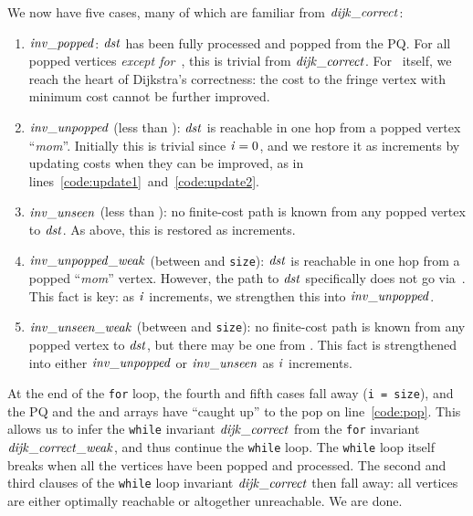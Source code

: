 We now have five cases, many of which are familiar from $\mathit{dijk\_correct}$:
\begin{enumerate}
\item $\mathit{inv\_popped}$: $\mathit{dst}$ has been fully processed and
popped from the PQ.  For all popped vertices \emph{except for}~,
this is trivial from $\mathit{dijk\_correct}$. For~ itself, we reach the heart of Dijkstra's correctness: the cost to the fringe vertex with minimum cost cannot be further improved.  %
\item $\mathit{inv\_unpopped}$ (less than ): $\mathit{dst}$ is reachable in
one hop from a popped vertex ``\emph{mom}''. Initially this is trivial since $\mathit{i}=0$, and we restore it as  increments by updating costs when they can be improved, as in lines~\ref{code:update1}~and~\ref{code:update2}.
\item $\mathit{inv\_unseen}$ (less than ): no finite-cost path is known from any popped vertex to $\mathit{dst}$. As above, this is restored as  increments.
\item $\mathit{inv\_unpopped\_weak}$ (between  and \texttt{size}):
$\mathit{dst}$ is reachable in one hop from a popped ``\emph{mom}'' vertex.
However, the path to $\mathit{dst}$ specifically does not go via~.
This fact is key: as $\mathit{i}$ increments, we strengthen this 
into $\mathit{inv\_unpopped}$.
\item $\mathit{inv\_unseen\_weak}$ (between  and \texttt{size}):
no finite-cost path is known from any popped vertex to
$\mathit{dst}$, but there may be one from .
This fact is strengthened into either 
$\mathit{inv\_unpopped}$ or $\mathit{inv\_unseen}$ as $\mathit{i}$
increments.
\end{enumerate}


At the end of the \texttt{for} loop, the fourth and fifth cases fall away 
(\texttt{i = size}), and the PQ and the  and  arrays
have ``caught up'' to the pop on line~\ref{code:pop}.
This allows us
to infer the \texttt{while} invariant $\mathit{dijk\_correct}$ from 
the \texttt{for} invariant
$\mathit{dijk\_correct\_weak}$, and thus continue the \texttt{while} loop.
The \texttt{while} loop itself breaks when all the vertices have been popped
and processed. The second and third clauses of the \texttt{while} loop invariant
$\mathit{dijk\_correct}$ then fall away:
all vertices are either optimally reachable or altogether unreachable. 
We are done.

